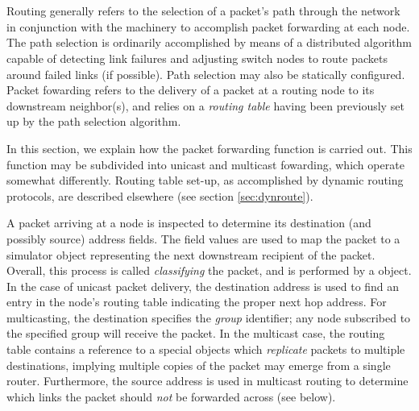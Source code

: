 %
%
\section{}

Routing generally refers to the selection of a packet's path
through the network in conjunction with the machinery
to accomplish packet forwarding at each node.
The path selection is ordinarily accomplished by means
of a distributed algorithm capable of detecting link
failures and adjusting switch nodes to route packets
around failed links (if possible).
Path selection may also be statically configured.
Packet fowarding refers to the delivery of a packet
at a routing node to its downstream neighbor(s), and
relies on a {\em routing table} having been previously
set up by the path selection algorithm.

In this section, we explain how the packet forwarding
function is carried out.
This function may be subdivided into unicast and
multicast fowarding, which operate somewhat differently.
Routing table set-up, as accomplished by
dynamic routing protocols, are
described elsewhere (see section \ref{sec:dynroute}).

A packet arriving at a node is inspected to determine
its destination (and possibly source) address fields.
The field values are used to map the packet to a
simulator object representing the next downstream recipient
of the packet.
Overall, this process is called {\em classifying} the packet, and
is performed by a  object.
In the case of unicast packet delivery, the destination address
is used to find an entry in the node's routing table
indicating the proper next hop address.
For multicasting, the destination specifies the
{\em group} identifier; any node subscribed to the specified
group will receive the packet.
In the multicast case, the routing table contains a reference
to a special objects which {\em replicate} packets to
multiple destinations, implying multiple copies of the packet may emerge
from a single router.
Furthermore, the source address is used in multicast
routing to determine which links the packet should {\em not}
be forwarded across (see below).

\subsection{}

